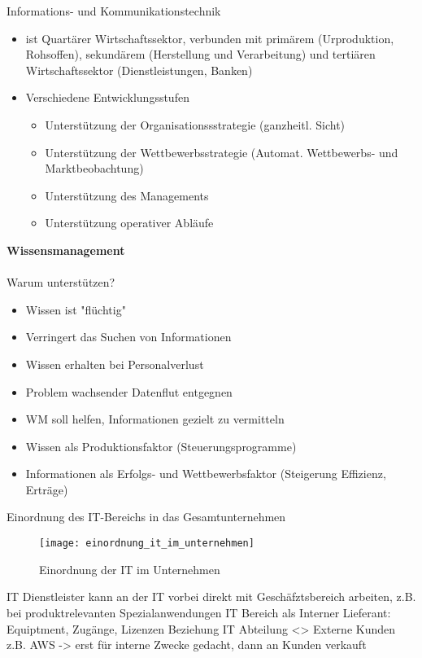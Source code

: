 Informations- und Kommunikationstechnik
\begin{itemize}
    \item ist Quartärer Wirtschaftssektor, verbunden mit primärem (Urproduktion, Rohsoffen), sekundärem (Herstellung und Verarbeitung) und tertiären Wirtschaftssektor (Dienstleistungen, Banken)
    \item Verschiedene Entwicklungsstufen
    \begin{itemize}
        \item Unterstützung der Organisationssstrategie (ganzheitl. Sicht)
        \item Unterstützung der Wettbewerbsstrategie (Automat. Wettbewerbs- und Marktbeobachtung)
        \item Unterstützung des Managements
        \item Unterstützung operativer Abläufe
    \end{itemize}
\end{itemize}

\textbf{Wissensmanagement} \\
\\Warum unterstützen?
\begin{itemize}
    \item Wissen ist "flüchtig"
    \item Verringert das Suchen von Informationen
    \item Wissen erhalten bei Personalverlust
    \item Problem wachsender Datenflut entgegnen
    \item WM soll helfen, Informationen gezielt zu vermitteln
    \item Wissen als Produktionsfaktor (Steuerungsprogramme)
    \item Informationen als Erfolgs- und Wettbewerbsfaktor (Steigerung Effizienz, Erträge)
\end{itemize}

Einordnung des IT-Bereichs in das Gesamtunternehmen

\begin{figure}[H]
    \caption{Einordnung der IT im Unternehmen}
    \texttt{[image: einordnung\_it\_im\_unternehmen]}
    \\
    \cite[Quelle: Vgl.][]{FOM}
\end{figure}

IT Dienstleister kann an der IT vorbei direkt mit Geschäfztsbereich arbeiten, z.B. bei produktrelevanten Spezialanwendungen 
IT Bereich als Interner Lieferant: Equiptment, Zugänge, Lizenzen
Beziehung IT Abteilung <> Externe Kunden z.B. AWS -> erst für interne Zwecke gedacht, dann an Kunden verkauft


